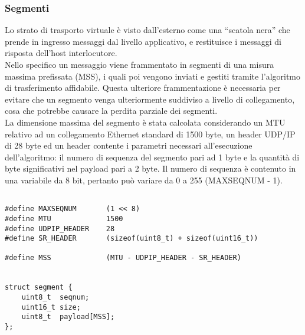 \subsubsection{Segmenti}
Lo strato di trasporto virtuale è visto dall'esterno come una ``scatola nera''
che prende in ingresso messaggi dal livello applicativo, e restituisce i 
messaggi di risposta dell'host interlocutore.\\
Nello specifico un messaggio viene frammentato in segmenti di una misura 
massima prefissata (MSS), i quali poi vengono inviati e gestiti tramite 
l'algoritmo di trasferimento affidabile. Questa ulteriore frammentazione è 
necessaria per evitare che un segmento venga ulteriormente suddiviso a livello
di collegamento, cosa che potrebbe causare la perdita parziale dei segmenti.\\
La dimensione massima del segmento è stata calcolata considerando un MTU 
relativo ad un collegamento Ethernet standard di 1500 byte, un header UDP/IP
di 28 byte ed un header contente i parametri necessari all'esecuzione 
dell'algoritmo: il numero di sequenza del segmento pari ad 1 byte e la 
quantità di byte significativi nel payload pari a 2 byte.
Il numero di sequenza è contenuto in una variabile da 8 bit, pertanto può
variare da 0 a 255 (MAXSEQNUM - 1).
\begin{lstlisting}[title=transport.h]

#define MAXSEQNUM       (1 << 8)
#define MTU             1500
#define UDPIP_HEADER    28
#define SR_HEADER       (sizeof(uint8_t) + sizeof(uint16_t))

#define MSS             (MTU - UDPIP_HEADER - SR_HEADER)


struct segment {
	uint8_t  seqnum;
	uint16_t size;
	uint8_t  payload[MSS];
};
\end{lstlisting}
